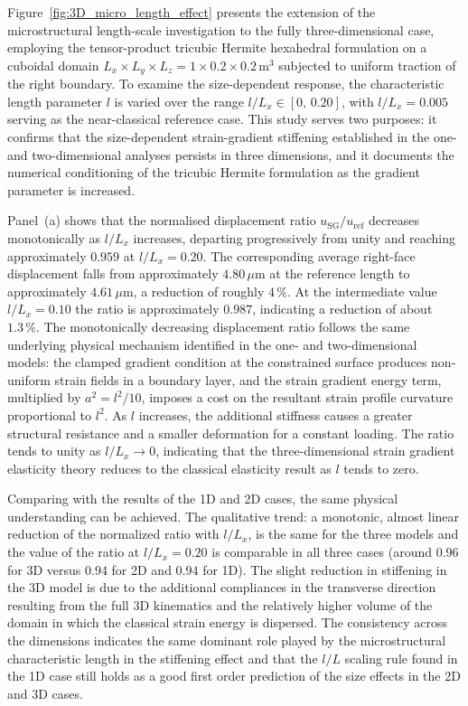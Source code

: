 \documentclass[final,3p,times,fleqn]{elsarticle}
\begin{document}
Figure~\ref{fig:3D_micro_length_effect} presents the extension of the microstructural
length-scale investigation to the fully three-dimensional case, employing the
tensor-product tricubic Hermite hexahedral formulation on a cuboidal
domain $L_{x}\times L_{y}\times L_{z}=1\times0.2\times0.2\,\mathrm{m}^{3}$
subjected to uniform traction of the right boundary. To examine the size-dependent response, the characteristic length
parameter $l$ is varied over the range
$l/L_{x}\in[0,\,0.20]$, with
$l/L_{x}=0.005$ serving as the near-classical reference case.
This study serves two purposes: it confirms that the size-dependent
strain-gradient stiffening established in the one- and two-dimensional
analyses persists in three dimensions, and it documents the numerical
conditioning of the tricubic Hermite formulation as the gradient
parameter is increased.

Panel~(a) shows that the normalised displacement ratio
$u_{\mathrm{SG}}/u_{\mathrm{ref}}$ decreases monotonically as $l/L_{x}$
increases, departing progressively from unity and reaching
approximately $0.959$ at $l/L_{x}=0.20$.
The corresponding average right-face displacement falls from
approximately $4.80\,\mu\mathrm{m}$ at the reference length to
approximately $4.61\,\mu\mathrm{m}$, a reduction of roughly $4\,\%$.
At the intermediate value $l/L_{x}=0.10$ the ratio is approximately
$0.987$, indicating a reduction of about $1.3\,\%$.
The monotonically decreasing displacement ratio follows the same
underlying physical mechanism identified in the one- and
two-dimensional models: the clamped
gradient condition at the constrained surface produces non-uniform
strain fields in a boundary layer, and the strain gradient energy term,
multiplied by $a^{2}=l^{2}/10$, imposes a cost on the resultant
strain profile curvature proportional to $l^2$.
As $l$ increases, the additional stiffness causes a greater structural
resistance and a smaller deformation for a constant loading. The ratio
tends to unity as $l/L_{x}\rightarrow 0$, indicating that the
three-dimensional strain gradient elasticity theory reduces to the
classical elasticity result as $l$ tends to zero.

Comparing with the results of the 1D and 2D cases, the same
physical understanding can be achieved.
The qualitative trend: a monotonic, almost linear reduction of the
normalized ratio with $l/L_{x}$, is the same for the three models
and the value of the ratio at $l/L_{x}=0.20$ is comparable in all
three cases (around $0.96$ for 3D versus $0.94$ for 2D and $0.94$
for 1D).
The slight reduction in stiffening in the 3D model is due to the
additional compliances in the transverse direction resulting from the
full 3D kinematics and the relatively higher volume of the domain in
which the classical strain energy is dispersed.
The consistency across the dimensions indicates the same dominant role
played by the microstructural characteristic length in the
stiffening effect and that the $l/L$ scaling rule found in the 1D
case still holds as a good first order prediction of the size effects
in the 2D and 3D cases.
\end{document}
